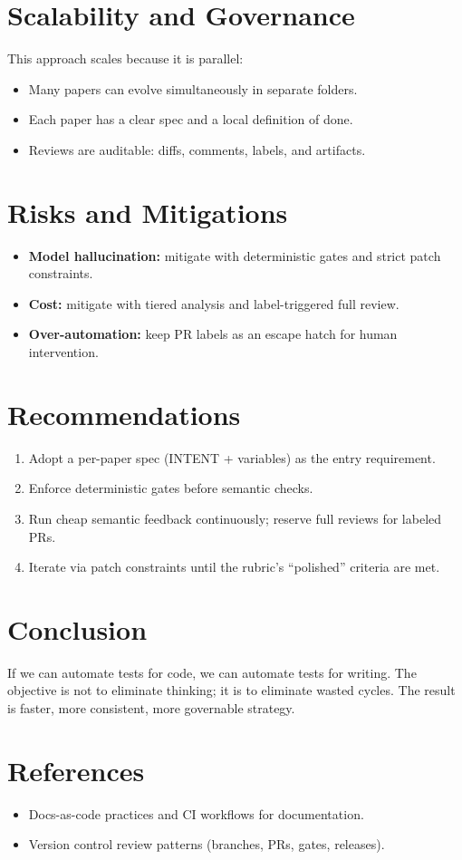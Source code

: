 \documentclass[11pt]{article}
\begin{document}
\section{Scalability and Governance}
This approach scales because it is parallel:
\begin{itemize}
  \item Many papers can evolve simultaneously in separate folders.
  \item Each paper has a clear spec and a local definition of done.
  \item Reviews are auditable: diffs, comments, labels, and artifacts.
\end{itemize}

\section{Risks and Mitigations}
\begin{itemize}
  \item \textbf{Model hallucination:} mitigate with deterministic gates and strict patch constraints.
  \item \textbf{Cost:} mitigate with tiered analysis and label-triggered full review.
  \item \textbf{Over-automation:} keep PR labels as an escape hatch for human intervention.
\end{itemize}

\section{Recommendations}
\begin{enumerate}
  \item Adopt a per-paper spec (INTENT + variables) as the entry requirement.
  \item Enforce deterministic gates before semantic checks.
  \item Run cheap semantic feedback continuously; reserve full reviews for labeled PRs.
  \item Iterate via patch constraints until the rubric's ``polished'' criteria are met.
\end{enumerate}

\section{Conclusion}
If we can automate tests for code, we can automate tests for writing. The objective is not to eliminate thinking; it is to eliminate wasted cycles. The result is faster, more consistent, more governable strategy.

\section{References}
\begin{itemize}
  \item Docs-as-code practices and CI workflows for documentation.
  \item Version control review patterns (branches, PRs, gates, releases).
\end{itemize}
\end{document}
